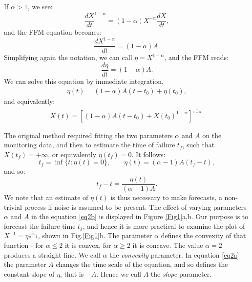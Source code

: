 \documentclass{article}
\begin{document}
If $\alpha > 1$, we see:
$$\frac{dX}{dt}^{1-\alpha}=(1-\alpha)X^{-\alpha}\frac{dX}{dt},$$
and the FFM equation becomes:
$$\frac{dX^{1-\alpha}}{dt}=(1-\alpha)A.$$
Simplifying again the notation, we can call $\eta=X^{1-\alpha}$, and the FFM reads:
$$\frac{d\eta}{dt}=(1-\alpha)A.$$
We can solve this equation by immediate integration,
\begin{align}\label{eq2a}
\eta(t)=(1-\alpha)A(t-t_0)+\eta(t_0),
\end{align}
and equivalently:
\begin{align}\label{eq2b}
X(t)=\left[(1-\alpha)A(t-t_0)+X(t_0)^{1-\alpha}\right]^{\frac{1}{1-\alpha}}.
\end{align}

The original method required fitting the two parameters $\alpha$ and $A$ on the monitoring data, and then to estimate the time of failure $t_f$, such that $X(t_f) =+\infty$, or equivalently $\eta(t_f)=0$. It follows:
$$t_f=\inf\{t:\eta(t)=0\}, \quad\quad \eta(t)=(\alpha-1)A(t_f-t),$$
and so:
$$t_f-t=\frac{\eta(t)}{(\alpha-1)A}.$$
We note that an estimate of $\eta(t)$ is thus necessary to make forecasts, a non-trivial process if noise is assumed to be present. 
The effect of varying parameters $\alpha$ and $A$ in the equation \ref{eq2b} is displayed in Figure \ref{Fig1}a,b. Our purpose is to forecast the failure time $t_f$, and hence it is more practical to examine the plot of $X^{-1}=\eta^{\frac{1}{\alpha-1}}$, shown in Fig.\ref{Fig1}b. The parameter $\alpha$ defines the convexity of that function - for $\alpha\le2$ it is convex, for $\alpha\ge2$ it is concave. The value $\alpha=2$ produces a straight line. We call $\alpha$ the {\it convexity} parameter. In equation \ref{eq2a} the parameter $A$ changes the time scale of the equation, and so defines the constant slope of $\eta$, that is $-A$. Hence we call $A$ the {\it slope} parameter.
\end{document}
